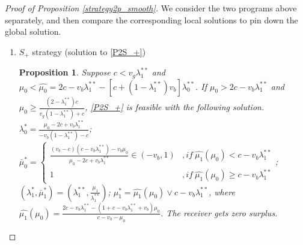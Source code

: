 \documentclass[11pt]{extarticle}
\newtheorem{proposition}{Proposition}
\newcommand{\M}{\vee}
\begin{document}
\begin{proof}[Proof of Proposition \ref{strategy2p_smooth}]
	We consider the two programs above separately, and then compare the corresponding local solutions to pin down the global solution.
	
	\begin{enumerate}
		\item $S_+$ strategy (solution to \eqref{P2S_+})
		
		\begin{proposition}\label{strategy2S_+}
			Suppose $c < v_g\lambda_1^{**}$ and $\mu_0<\widehat{\mu_0} = 2c-v_b\lambda_1^{**}-[c+(1-\lambda_1^{**})v_b]\lambda_0^{**}$. If $\mu_0 > 2c-v_b\lambda_1^{**}$ and $\mu_0 \geq \frac{(2-\lambda_1^{**})c}{v_g(1-\lambda_1^{**})+c}$, \eqref{P2S_+} is feasible with the following solution. $\lambda_0^* =
			\frac{\mu_0-2c +v_b \lambda_1^{**}}{-v_b(1-\lambda_1^{**})-c}$; $\bar{\mu}_0^* = \begin{cases}
			\frac{(v_b-c)(c - v_b\lambda_1^{**})-v_b\mu_0}{\mu_0-2c+v_b \lambda_1^{**}} \in (-v_b,1)& ,if~\widehat{\mu_1}(\mu_0)<c-v_b\lambda_1^{**}\\
			1 & ,if~\widehat{\mu_1}(\mu_0)\geq c-v_b\lambda_1^{**}
			\end{cases}$; $(\lambda_1^*,\bar{\mu}_1^*)=(\lambda_1^{**},\frac{\mu_1}{\lambda_1^{**}})$; $\mu_1^* = \widehat{\mu_1}(\mu_0) \M c-v_b\lambda_1^{**}$, where $\widehat{\mu_1}(\mu_0) = \frac{2c-v_b\lambda_1^{**}-(1+c-v_b\lambda_1^{**}+v_b)\mu_0}{c-v_b-\mu_0}$. The receiver gets zero surplus.
		\end{proposition}
		

\end{enumerate}
\end{proof}
\end{document}
